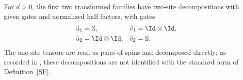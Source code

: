 \begin{lemma}
    \label{thm:threeMPU2_supplied_decompositions}
    \leanok
    For $d>0$, the first two transformed families have two-site
    decompositions with given gates and normalized half factors, with gates
    \begin{align}
        \widetilde u_1 & =\mathbb S,     &
        \widetilde v_1 & =\Id\otimes\Id,   \\
        \widetilde u_2 & =\Id\otimes\Id, &
        \widetilde v_2 & =\mathbb S.
    \end{align}
    The one-site tensors are read as pairs of spins and decomposed directly;
    as recorded in \cite{gap:mpu_shift_supplied_standard_forms}, these decompositions are not identified with the standard form of
    Definition~\ref{SF}.
\end{lemma}

